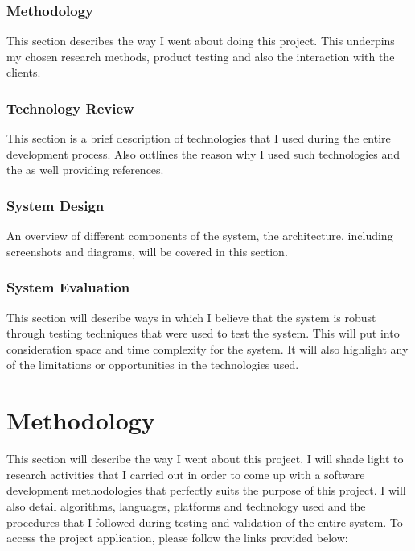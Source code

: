\subsection{Methodology}
This section describes the way I went about doing this project. This underpins my chosen research methods, product testing and also the interaction with the clients. 

\subsection{Technology Review}
This section is a brief description of technologies that I used during the entire development process. Also outlines the reason why I used such technologies and the as well providing references.

\subsection{System Design}
An overview of different components of the system, the architecture, including screenshots and diagrams, will be covered in this section.

\subsection{System Evaluation}
This section will describe ways in which I believe that the system is robust through testing techniques that were used to test the system. This will put into consideration space and time complexity for the system. It will also highlight any of the limitations or opportunities in the technologies used. 


\chapter{Methodology}
This section will describe the way I went about this project. I will shade light to research activities that I carried out in order to come up with a software development methodologies that perfectly suits the purpose of this project. I will also detail algorithms, languages, platforms and technology used and the procedures that I followed during testing and validation of the entire system.
To access the project application, please follow the links provided below:

\paragraph{}
